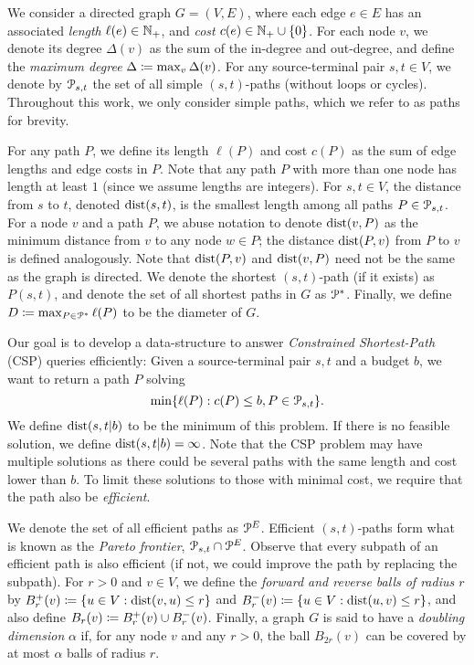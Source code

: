 We consider a directed graph $G=(V,E)$, where each edge $e\in E$ has an associated \emph{length} $\ell(e)\in\mathbb{N}_+$, and \emph{cost} $c(e)\in\mathbb{N}_+\cup\{0\}$.
For each node $v$, we denote its degree $\Delta(v)$ as the sum of the in-degree and out-degree, and define the \emph{maximum degree} $\Delta \coloneqq \max_v\Delta(v)$.
For any source-terminal pair $s,t\in V$, we denote by $\mathcal{P}_{s,t}$ the set of all simple $(s,t)$-paths (without loops or cycles). 
Throughout this work, we only consider simple paths, which we refer to as paths for brevity.

For any path $P$, we define its length $\ell(P)$ and cost $c(P)$ as the sum of edge lengths and edge costs in $P$. 
Note that any path $P$ with more than one node has length at least $1$ (since we assume lengths are integers).
For $s,t\in V$, the distance from $s$ to $t$, denoted $\mbox{dist}(s,t)$, is the smallest length among all paths $P\in\mathcal{P}_{s,t}$.
For a node $v$ and a path $P$, we abuse notation to denote $\mbox{dist}(v,P)$ as the minimum distance from $v$ to any node $w\in P$; the distance $\mbox{dist}(P,v)$ from $P$ to $v$ is defined analogously.
Note that  $\mbox{dist}(P,v)$ and  $\mbox{dist}(v,P)$ need not be the same as the graph is directed.
We denote the shortest $(s,t)$-path (if it exists) as $P(s,t)$, and denote the set of all shortest paths in $G$ as $\mathcal{P}^*$.
Finally, we define $D\coloneqq\max_{P\in\mathcal{P}^*}\ell(P)$ to be the diameter of $G$.

Our goal is to develop a data-structure to answer \emph{Constrained Shortest-Path} (CSP) queries efficiently: 
Given a source-terminal pair $s,t$ and a budget $b$, we want to return a path $P$ solving
\[
\min\{\ell(P):c(P) \leq b, P \in \mathcal{P}_{s,t} \}.
\]
We define $\mbox{dist}(s,t|b)$ to be the minimum of this problem.
If there is no feasible solution, we define $\mbox{dist}(s,t|b)=\infty$.
Note that the CSP problem may have multiple solutions as there could be several paths with the same length and cost lower than $b$.
To limit these solutions to those with minimal cost, we require that the path also be \emph{efficient}. 
We denote the set of all efficient paths as $\mathcal{P}^E$.
Efficient $(s,t)$-paths form what is known as the \emph{Pareto frontier}, $\mathcal{P}_{s,t}\cap\mathcal{P}^E$.
Observe that every subpath of an efficient path is also efficient (if not, we could improve the path by replacing the subpath).
For $r>0$ and $v\in V$, we define the \emph{forward and reverse balls of radius $r$} by $B^+_r(v)\coloneqq\{u\in V: \mbox{dist}(v,u)\leq r\}$ and $B^-_r(v)\coloneqq\{u\in V: \mbox{dist}(u,v)\leq r\}$, and also define $B_r(v)\coloneqq B^+_r(v)\cup B^-_r(v)$.
Finally, a graph $G$ is said to have a \emph{doubling dimension} $\alpha$ if, for any node $v$ and any $r>0$, the ball $B_{2r}(v)$ can be covered by at most $\alpha$ balls of radius $r$.